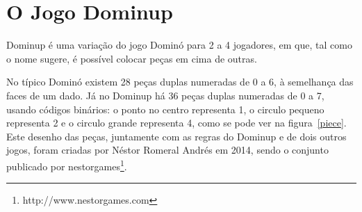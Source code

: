 \documentclass[a4paper]{article}
\begin{document}

\newpage

%
%
%
%
%
%
%


\section{O Jogo Dominup}

Dominup é uma variação do jogo Dominó para 2 a 4 jogadores, em que, tal como o nome sugere, é possível colocar peças em cima de outras.

No típico Dominó existem 28 peças duplas numeradas de 0 a 6, à semelhança das faces de um dado. Já no Dominup há 36 peças duplas numeradas de 0 a 7, usando códigos binários: o ponto no centro representa 1, o circulo pequeno representa 2 e o circulo grande representa 4, como se pode ver na figura~\ref{piece}. Este desenho das peças, juntamente com as regras do Dominup e de dois outros jogos, foram criadas por Néstor Romeral Andrés em 2014, sendo o conjunto publicado por nestorgames\footnote[1]{http://www.nestorgames.com}.
\end{document}
